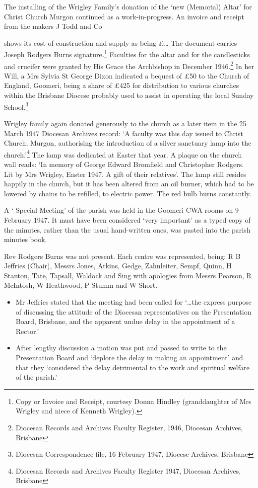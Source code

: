 The installing of the Wrigley Family's donation of the `new (Memorial)
Altar' for Christ Church Murgon continued as a work-in-progress. An
invoice and receipt from the makers J Todd and Co

shows its cost of construction and supply as being £\ldots{} The
document carries Joseph Rodgers Burns signature\emph{.}\footnote{Copy or
  Invoice and Receipt, courtesy Donna Hindley (granddaughter of Mrs
  Wrigley and niece of Kenneth Wrigley).} Faculties for the altar and
for the candlesticks and crucifer were granted by His Grace the
Archbishop in December 1946.\footnote{Diocesan Records and Archives
  Faculty Register, 1946, Diocesan Archives, Brisbane} In her Will, a
Mrs Sylvia St George Dixon indicated a bequest of £50 to the Church of
England, Goomeri, being a share of £425 for distribution to various
churches within the Brisbane Diocese probably used to assist in
operating the local Sunday School.\footnote{Diocesan Correspondence
  file, 16 February 1947, Diocese Archives, Brisbane}

Wrigley family again donated generously to the church as a later item in
the 25 March 1947 Diocesan Archives record: `A faculty was this day
issued to Christ Church, Murgon, authorising the introduction of a
silver sanctuary lamp into the church.'\footnote{Diocesan Records and
  Archives Faculty Register 1947, Diocesan Archives, Brisbane} The lamp
was dedicated at Easter that year. A plaque on the church wall reads:
`In memory of George Edward Bromfield and Christopher Rodgers. Lit by
Mrs Wrigley, Easter 1947. A gift of their relatives'. The lamp still
resides happily in the church, but it has been altered from an oil
burner, which had to be lowered by chains to be refilled, to electric
power. The red bulb burns constantly.

A ` Special Meeting' of the parish was held in the Goomeri CWA rooms on
9 February 1947. It must have been considered `very important' as a
typed copy of the minutes, rather than the usual hand-written ones, was
pasted into the parish minutes book.

Rev Rodgers Burns was not present. Each centre was represented, being: R
B Jeffries (Chair), Messrs Jones, Atkins, Gedge, Zahnleiter, Sempf,
Quinn, H Stanton, Tate, Tapsall, Waldock and Sing with apologies from
Messrs Pearson, R McIntosh, W Heathwood, P Stumm and W Short.

\begin{itemize}
\item
  Mr Jeffries stated that the meeting had been called for `\ldots the
  express purpose of discussing the attitude of the Diocesan
  representatives on the Presentation Board, Brisbane, and the apparent
  undue delay in the appointment of a Rector.'
\item
  After lengthy discussion a motion was put and passed to write to the
  Presentation Board and `deplore the delay in making an appointment'
  and that they `considered the delay detrimental to the work and
  spiritual welfare of the parish.'
\end{itemize}

